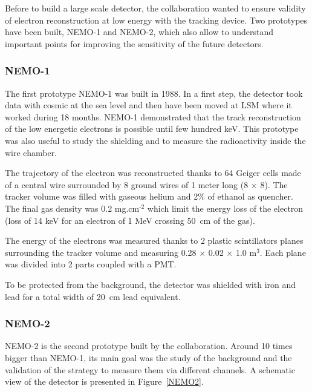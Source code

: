 \documentclass[main.tex]{subfiles}
\begin{document}
\NI Before to build a large scale detector, the collaboration wanted to ensure validity of electron reconstruction at low energy with the tracking device. Two prototypes have been built, NEMO-1 and NEMO-2, which also allow to understand important points for improving the sensitivity of the future detectors. 

\subsubsection{NEMO-1}

\NI The first prototype NEMO-1 was built in 1988. In a first step, the detector took data with cosmic at the sea level and then  have been moved at LSM where it worked during 18 months. NEMO-1 demonstrated that the track reconstruction of the low energetic electrons is possible until few hundred keV. This prototype was also useful to study the shielding and to measure the radioactivity inside the wire chamber.


\bigskip


\NI The trajectory of the electron was reconstructed thanks to 64 Geiger cells made of a central wire surrounded by 8 ground wires of 1 meter long (8 $\times$ 8). The tracker volume was filled with gaseous helium and 2\% of ethanol as quencher. The final gas density was 0.2 mg.cm$^{\text{-2}}$ which limit the energy loss of the electron (loss of 14 keV for an electron of 1 MeV crossing 50~cm of the gas).


\bigskip


\NI The energy of the electrons was measured thanks to 2 plastic scintillators planes surrounding the tracker volume and measuring 0.28 $\times$ 0.02 $\times$ 1.0 m$^{\text{3}}$. Each plane was divided into 2 parts coupled with a PMT. 


\bigskip


\NI To be protected from the background, the detector was shielded with iron and lead for a total width of 20~cm lead equivalent.


\subsubsection{NEMO-2}


NEMO-2 is the second prototype built by the collaboration. Around 10 times bigger than NEMO-1, its main goal was the study of the background and the validation of the strategy to measure them via different channels. A schematic view of the detector is presented in Figure~\ref{NEMO2}.
\end{document}
